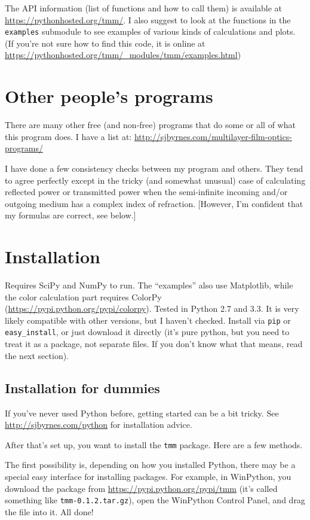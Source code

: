 \documentclass[12pt]{article}
\renewcommand{\(}{\left(}
\renewcommand{\)}{\right)}
\begin{document}
The API information (list of functions and how to call them) is available at \url{https://pythonhosted.org/tmm/}. I also suggest to look at the functions in the \verb=examples= submodule to see examples of various kinds of calculations and plots. (If you're not sure how to find this code, it is online at \url{https://pythonhosted.org/tmm/_modules/tmm/examples.html})

\section{Other people's programs}

There are many other free (and non-free) programs that do some or all of what this program does. I have a list at: \url{http://sjbyrnes.com/multilayer-film-optics-programs/}

I have done a few consistency checks between my program and others. They tend to agree perfectly except in the tricky (and somewhat unusual) case of calculating reflected power or transmitted power when the semi-infinite incoming and/or outgoing medium has a complex index of refraction. [However, I'm confident that my formulas are correct, see below.]

\section{Installation}

Requires SciPy and NumPy to run. The ``examples'' also use Matplotlib, while the color calculation part requires ColorPy (\url{https://pypi.python.org/pypi/colorpy}). Tested in Python 2.7 and 3.3. It is very likely compatible with other versions, but I haven't checked. Install via \verb=pip= or \verb=easy_install=, or just download it directly (it's pure python, but you need to treat it as a package, not separate files. If you don't know what that means, read the next section).

\subsection{Installation for dummies}

If you've never used Python before, getting started can be a bit tricky. See \url{http://sjbyrnes.com/python} for installation advice.

After that's set up, you want to install the \verb=tmm= package. Here are a few methods.

The first possibility is, depending on how you installed Python, there may be a special easy interface for installing packages. For example, in WinPython, you download the package from \url{https://pypi.python.org/pypi/tmm} (it's called something like \verb=tmm-0.1.2.tar.gz=), open the WinPython Control Panel, and drag the file into it. All done!
\end{document}
